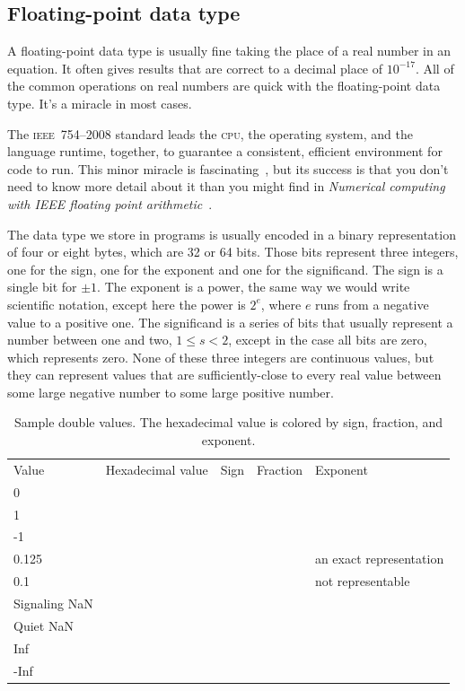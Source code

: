 \documentclass[fleqn,10pt]{olplainarticle}
\newcommand{\cpu}{\textsc{cpu}\xspace}
\newcommand{\ieee}{\textsc{ieee}\xspace}
\begin{document}
\subsection{Floating-point data type}

A floating-point data type is usually fine taking the place of a real number
in an equation. It often gives results that are correct to a decimal place
of $10^{-17}.$ All of the common operations on real numbers are quick with
the floating-point data type. It's a miracle in most cases.

The \ieee~754--2008 standard leads the \cpu, the operating system, and 
the language runtime, together, to guarantee a consistent, efficient environment
for code to run. This minor miracle is fascinating~\citep{muller2018handbook},
but its success is that you don't need to know more detail about it than
you might find in \emph{Numerical computing with IEEE floating point arithmetic}~\citep{overton2001numerical,goldberg1991every}.

The data type we store in programs is usually encoded in a binary representation
of four or eight bytes, which are 32 or 64 bits. Those bits represent three integers,
one for the sign, one for the exponent and one for the significand. The sign is
a single bit for $\pm 1$. The exponent is a power, the same way we would write
scientific notation, except here the power is $2^e$, where $e$ runs from a
negative value to a positive one. The significand is a series of bits that
usually represent a number between one and two, $1 \le s < 2$, except in the
case all bits are zero, which represents zero. None of these three
integers are continuous values, but they can represent values that are
sufficiently-close to every real value between some large negative number
to some large positive number.

\begin{table}
\begin{tabular}{lllll}
Value & Hexadecimal value & Sign & Fraction & Exponent \\
0 &&&& \\
1 &&&& \\
-1 &&&& \\
0.125 &&&& an exact representation\\
0.1 &&&& not representable\\
Signaling NaN &&&& \\
Quiet NaN &&&& \\
Inf &&&& \\
-Inf &&&&
\end{tabular}
\caption{Sample double values. The hexadecimal value is colored by sign, fraction, and exponent.}
\end{table}
\end{document}
